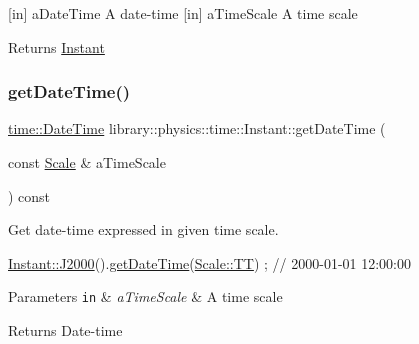 \mbox{[}in\mbox{]} a\+Date\+Time A date-\/time  \mbox{[}in\mbox{]} a\+Time\+Scale A time scale \begin{DoxyReturn}{Returns}
\hyperlink{classlibrary_1_1physics_1_1time_1_1_instant}{Instant} 
\end{DoxyReturn}
\mbox{\label{classlibrary_1_1physics_1_1time_1_1_instant_ae40dbe983c197c961c0cf5aceefa352c}} 
\subsubsection{\texorpdfstring{get\+Date\+Time()}{getDateTime()}}
{\footnotesize\ttfamily \hyperlink{classlibrary_1_1physics_1_1time_1_1_date_time}{time\+::\+Date\+Time} library\+::physics\+::time\+::\+Instant\+::get\+Date\+Time (\begin{DoxyParamCaption}\item[{const \hyperlink{namespacelibrary_1_1physics_1_1time_a09d2bc9fbc7b0b5f92e1419bd655e6bb}{Scale} \&}]{a\+Time\+Scale }\end{DoxyParamCaption}) const}



Get date-\/time expressed in given time scale. 


\begin{DoxyCode}
\hyperlink{classlibrary_1_1physics_1_1time_1_1_instant_a2a4f57aa71693b8def06788d55bc3bd3}{Instant::J2000}().\hyperlink{classlibrary_1_1physics_1_1time_1_1_instant_ae40dbe983c197c961c0cf5aceefa352c}{getDateTime}(\hyperlink{namespacelibrary_1_1physics_1_1time_a09d2bc9fbc7b0b5f92e1419bd655e6bbadf1f3edb9115acb0a1e04209b7a9937b}{Scale::TT}) ; \textcolor{comment}{// 2000-01-01 12:00:00}
\end{DoxyCode}



\begin{DoxyParams}[1]{Parameters}
\mbox{\tt in}  & {\em a\+Time\+Scale} & A time scale \\
\hline
\end{DoxyParams}
\begin{DoxyReturn}{Returns}
Date-\/time 
\end{DoxyReturn}
\mbox{\label{classlibrary_1_1physics_1_1time_1_1_instant_a592844ceab80e29ab65766aedc194acb}} 
